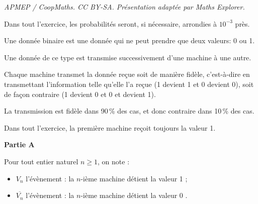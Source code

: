 \documentclass[10pt]{article}
\begin{document}
\noindent\textit{APMEP / CoopMaths. CC BY-SA. Présentation adaptée par Maths Explorer.}\par\medskip
\medskip

Dans tout l'exercice, les probabilités seront, si nécessaire, arrondies à $10^{-3}$ près.

Une donnée binaire est une donnée qui ne peut prendre que deux valeurs:  0 ou 1.

Une donnée de ce type est transmise successivement d'une machine à une autre.

Chaque machine transmet la donnée reçue soit de manière fidèle, c'est-à-dire en
transmettant l'information telle qu'elle l'a reçue (1 devient 1 et 0 devient 0), soit de façon
contraire (1 devient 0 et 0 et devient 1).

La transmission est fidèle dans 90\,\% des cas, et donc contraire dans 10\,\% des cas.

Dans tout l'exercice, la première machine reçoit toujours la valeur 1.

\medskip

\textbf{Partie A}

\medskip

Pour tout entier naturel $n \geqslant 1$, on note :

\begin{itemize}[label=$\bullet~$]
\item $V_n$ l'évènement : \og la $n$-ième machine détient la valeur 1 \fg{};
\item $\overline{V_n}$ l'évènement : \og la $n$-ième machine détient la valeur 0 \fg{}.
\end{itemize}

\medskip
\end{document}

